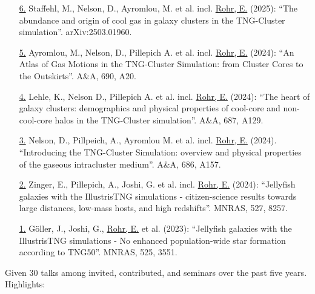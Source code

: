 \documentclass[a4paper,12pt,oneside]{article}
\begin{document}
\begin{enumerate}[wide, labelwidth=!, labelindent=-11pt, parsep=0pt]
    \item[\href{https://ui.adsabs.harvard.edu/abs/2025arXiv250301960S/abstract}{6.}] Staffehl, M., Nelson, D., Ayromlou, M. et al. incl. \underline{Rohr, E.} (2025): ``The abundance and origin of cool gas in galaxy clusters in the TNG-Cluster simulation''. arXiv:2503.01960.
    \item[\href{https://ui.adsabs.harvard.edu/abs/2024A\%26A...690A..20A/abstract}{5.}] Ayromlou, M., Nelson, D., Pillepich A. et al. incl. \underline{Rohr, E.} (2024): ``An Atlas of Gas Motions in the TNG-Cluster Simulation: from Cluster Cores to the Outskirts''. A\&A, 690, A20.
    \item[\href{https://ui.adsabs.harvard.edu/abs/2024A\%26A...687A.129L/abstract}{4.}] Lehle, K., Nelson D., Pillepich A. et al. incl. \underline{Rohr, E.} (2024): ``The heart of galaxy clusters: demographics and physical properties of cool-core and non-cool-core halos in the TNG-Cluster simulation''. A\&A, 687, A129.
    \item[\href{https://ui.adsabs.harvard.edu/abs/2024A&A...686A.157N/abstract}{3.}] Nelson, D., Pillpeich, A., Ayromlou M. et al. incl. \underline{Rohr, E.} (2024). ``Introducing the TNG-Cluster Simulation: overview and physical properties of the gaseous intracluster medium''. A\&A, 686, A157.
    \item[\href{https://ui.adsabs.harvard.edu/abs/2024MNRAS.527.8257Z/abstract}{2.}] Zinger, E., Pillepich, A., Joshi, G. et al. incl. \underline{Rohr, E.} (2024): ``Jellyfish galaxies with the IllustrisTNG simulations - citizen-science results towards large distances, low-mass hosts, and high redshifts''. MNRAS, 527, 8257.
    \item[\href{https://ui.adsabs.harvard.edu/abs/2023MNRAS.525.3551G/abstract}{1.}] G{\"o}ller, J., Joshi, G., \underline{Rohr, E.} et al. (2023): ``Jellyfish galaxies with the IllustrisTNG simulations - No enhanced population-wide star formation according to TNG50''. MNRAS, 525, 3551.
\end{enumerate}

\noindent{}

\vspace{5.5pt}

\noindent Given 30 talks among invited, contributed, and seminars over the past five years. Highlights:
\end{document}
